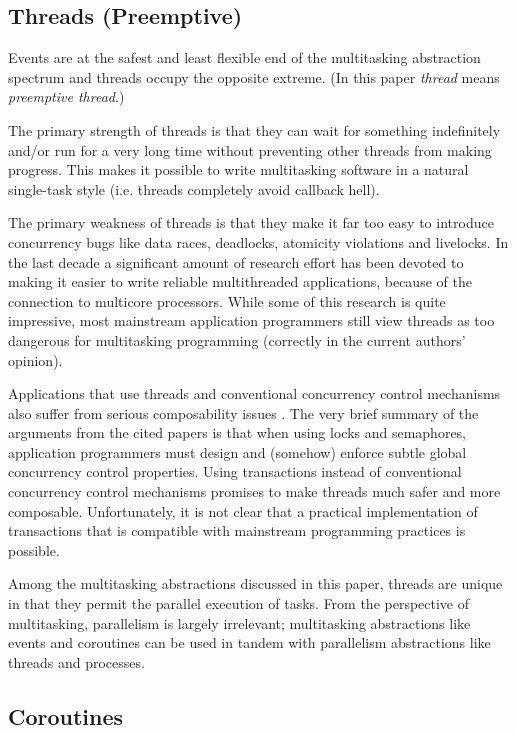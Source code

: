 \documentclass[10pt,preprint]{sigplanconf}
\begin{document}
\subsection{Threads (Preemptive)}

Events are at the safest and least flexible end of the multitasking abstraction spectrum and threads occupy the opposite extreme.
(In this paper \emph{thread} means \emph{preemptive thread}.)

The primary strength of threads is that they can wait for something indefinitely and/or run for a very long time without preventing other threads from making progress.
This makes it possible to write multitasking software in a natural single-task style (i.e. threads completely avoid callback hell).

The primary weakness of threads is that they make it far too easy to introduce concurrency bugs like data races, deadlocks, atomicity violations and livelocks.
In the last decade a significant amount of research effort has been devoted to making it easier to write reliable multithreaded applications, because of the connection to multicore processors.
While some of this research is quite impressive, most mainstream application programmers still view threads as too dangerous for multitasking programming (correctly in the current authors' opinion).

Applications that use threads and conventional concurrency control mechanisms also suffer from serious composability issues \cite{Harris2005, Grossman2007}.
The very brief summary of the arguments from the cited papers is that when using locks and semaphores, application programmers must design and (somehow) enforce subtle global concurrency control properties.
Using transactions instead of conventional concurrency control mechanisms promises to make threads much safer and more composable.
Unfortunately, it is not clear that a practical implementation of transactions that is compatible with mainstream programming practices is possible.

Among the multitasking abstractions discussed in this paper, threads are unique in that they permit the parallel execution of tasks.
From the perspective of multitasking, parallelism is largely irrelevant; multitasking abstractions like events and coroutines can be used in tandem with parallelism abstractions like threads and processes.

\subsection{Coroutines}
\end{document}
